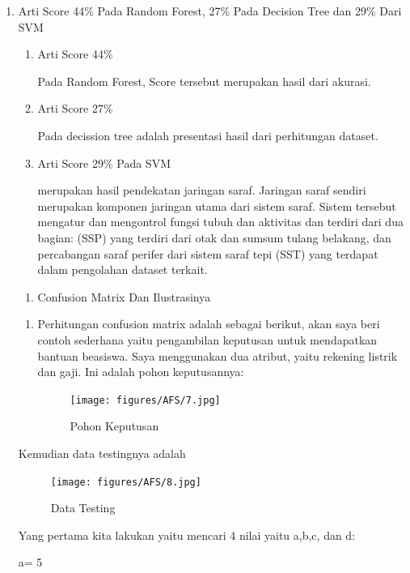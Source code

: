 \begin{enumerate}
\item Arti Score 44\% Pada Random Forest, 27\% Pada Decision Tree dan 29\% Dari SVM \par
\begin{enumerate}
\item Arti Score 44\% \par
Pada Random Forest, Score tersebut merupakan hasil dari akurasi.
\item Arti Score 27\% \par
Pada decission tree adalah presentasi hasil dari perhitungan dataset.
\item Arti Score 29\% Pada SVM \par
merupakan hasil pendekatan jaringan saraf. Jaringan saraf sendiri merupakan komponen jaringan utama dari sistem saraf. Sistem tersebut mengatur dan mengontrol fungsi tubuh dan aktivitas dan terdiri dari dua bagian:  (SSP) yang terdiri dari otak dan sumsum tulang belakang, dan percabangan saraf perifer dari sistem saraf tepi (SST) yang terdapat dalam pengolahan dataset terkait. 
\end{enumerate}

\begin {enumerate}
\item Confusion Matrix Dan Ilustrasinya
\end{enumerate}

\begin{enumerate}
\item Perhitungan confusion matrix adalah sebagai berikut, akan saya beri contoh sederhana yaitu pengambilan keputusan untuk mendapatkan bantuan beasiswa. Saya menggunakan dua atribut, yaitu rekening listrik dan gaji. Ini adalah pohon keputusannya:
 
\begin{figure}[ht]
\centering
\texttt{[image: figures/AFS/7.jpg]}
\caption{Pohon Keputusan}
\label{contoh}
\end{figure}

\end{enumerate}


Kemudian data testingnya adalah

\begin{figure}[ht]
\centering
\texttt{[image: figures/AFS/8.jpg]}
\caption{Data Testing}
\label{contoh}
\end{figure}

Yang pertama kita lakukan yaitu mencari 4 nilai yaitu a,b,c, dan d:

 a= 5


\end{enumerate}
